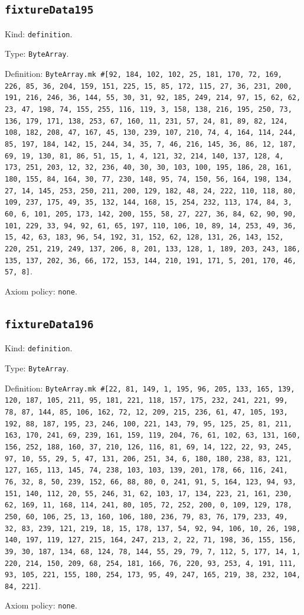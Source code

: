 \documentclass[11pt]{article}
\begin{document}
\subsection*{\texttt{fixtureData195}}
\noindent Kind: \texttt{definition}.\par
\noindent Type: \texttt{ByteArray}.\par
\noindent Definition: \texttt{ByteArray.mk \#[92, 184, 102, 102, 25, 181, 170, 72, 169, 226, 85, 36, 204, 159, 151, 225, 15, 85, 172, 115, 27, 36, 231, 200, 191, 216, 246, 36, 144, 55, 30, 31, 92, 185, 249, 214, 97, 15, 62, 62, 23, 47, 198, 74, 155, 255, 116, 119, 3, 158, 138, 216, 195, 250, 73, 136, 179, 171, 138, 253, 67, 160, 11, 231, 57, 24, 81, 89, 82, 124, 108, 182, 208, 47, 167, 45, 130, 239, 107, 210, 74, 4, 164, 114, 244, 85, 197, 184, 142, 15, 244, 34, 35, 7, 46, 216, 145, 36, 86, 12, 187, 69, 19, 130, 81, 86, 51, 15, 1, 4, 121, 32, 214, 140, 137, 128, 4, 173, 251, 203, 12, 32, 236, 40, 30, 30, 103, 100, 195, 186, 28, 161, 180, 155, 84, 164, 30, 77, 230, 148, 95, 74, 150, 56, 164, 198, 134, 27, 14, 145, 253, 250, 211, 200, 129, 182, 48, 24, 222, 110, 118, 80, 109, 237, 175, 49, 35, 132, 144, 168, 15, 254, 232, 113, 174, 84, 3, 60, 6, 101, 205, 173, 142, 200, 155, 58, 27, 227, 36, 84, 62, 90, 90, 101, 229, 33, 94, 92, 61, 65, 197, 110, 106, 10, 89, 14, 253, 49, 36, 15, 42, 63, 183, 96, 54, 192, 31, 152, 62, 128, 131, 26, 143, 152, 220, 251, 219, 249, 137, 206, 8, 201, 133, 128, 1, 189, 203, 243, 186, 135, 137, 202, 36, 66, 172, 153, 144, 210, 191, 171, 5, 201, 170, 46, 57, 8]}.\par
\noindent Axiom policy: \texttt{none}.\par
\subsection*{\texttt{fixtureData196}}
\noindent Kind: \texttt{definition}.\par
\noindent Type: \texttt{ByteArray}.\par
\noindent Definition: \texttt{ByteArray.mk \#[22, 81, 149, 1, 195, 96, 205, 133, 165, 139, 120, 187, 105, 211, 95, 181, 221, 118, 157, 175, 232, 241, 221, 99, 78, 87, 144, 85, 106, 162, 72, 12, 209, 215, 236, 61, 47, 105, 193, 192, 88, 187, 195, 23, 246, 100, 221, 143, 79, 95, 125, 25, 81, 211, 163, 170, 241, 69, 239, 161, 159, 119, 204, 76, 61, 102, 63, 131, 160, 156, 252, 188, 160, 37, 210, 126, 116, 81, 69, 14, 122, 22, 93, 245, 97, 10, 55, 29, 5, 47, 131, 206, 251, 34, 6, 180, 180, 238, 83, 121, 127, 165, 113, 145, 74, 238, 103, 103, 139, 201, 178, 66, 116, 241, 76, 32, 8, 50, 239, 152, 66, 88, 80, 0, 241, 91, 5, 164, 123, 94, 93, 151, 140, 112, 20, 55, 246, 31, 62, 103, 17, 134, 223, 21, 161, 230, 62, 169, 11, 168, 114, 241, 80, 105, 72, 252, 200, 0, 109, 129, 178, 250, 60, 106, 25, 13, 160, 106, 180, 236, 79, 83, 76, 179, 233, 49, 32, 83, 239, 121, 219, 18, 15, 178, 137, 54, 92, 94, 106, 10, 26, 198, 140, 197, 119, 127, 215, 164, 247, 213, 2, 22, 71, 198, 36, 155, 156, 39, 30, 187, 134, 68, 124, 78, 144, 55, 29, 79, 7, 112, 5, 177, 14, 1, 220, 214, 150, 209, 68, 254, 181, 166, 76, 220, 93, 253, 4, 191, 111, 93, 105, 221, 155, 180, 254, 173, 95, 49, 247, 165, 219, 38, 232, 104, 84, 221]}.\par
\noindent Axiom policy: \texttt{none}.\par
\end{document}
